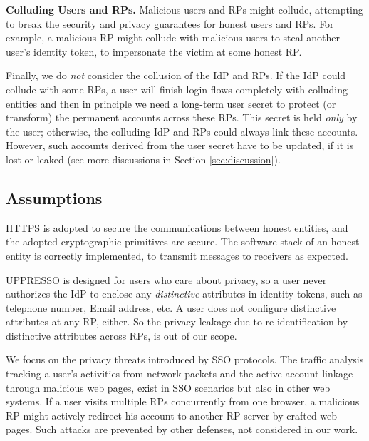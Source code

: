 \noindent \textbf{Colluding Users and RPs.}
Malicious users and RPs might collude,
 attempting to break the security and privacy guarantees for honest users and RPs.
For example, a malicious RP might collude with malicious users to steal another user's identity token,
    to impersonate the victim at some honest RP.

Finally, we do \emph{not} consider the collusion of the IdP and RPs.
    If the IdP could collude with some RPs,
        a user will finish login flows completely with colluding entities
        and then in principle we need a long-term user secret to protect (or transform) the permanent accounts across these RPs.
This secret is held \emph{only} by the user;
    otherwise, the colluding IdP and RPs could always link these accounts.
However, such accounts derived from the user secret have to be updated,
    if it is lost or leaked
    (see more discussions in Section \ref{sec:discussion}).

\subsection{Assumptions}
HTTPS is adopted to secure the communications between honest entities,
 and the adopted cryptographic primitives are secure.
The software stack of an honest entity is correctly implemented,
     to transmit messages to receivers as expected.

UPPRESSO is designed for users who care about privacy,
so a user never authorizes the IdP to enclose any \emph{distinctive} attributes in identity tokens,
 such as telephone number, Email address, etc.
A user does not configure  distinctive attributes at any RP, either.
So the privacy leakage due to re-identification by distinctive attributes across RPs,
    is out of our scope.

We focus on the privacy threats introduced by SSO protocols.
The traffic analysis tracking a user's activities from network packets
    and the active account linkage through malicious web pages,
        exist in SSO scenarios but also in other web systems.
If a user visits multiple RPs concurrently from one browser,
        a malicious RP might actively redirect his account to another RP server by crafted web pages.
Such attacks are prevented by other defenses,
    not considered in our work.


